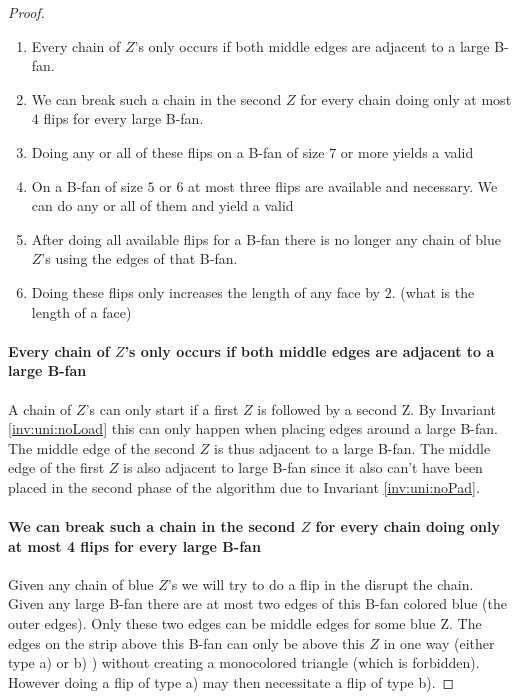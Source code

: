 \begin{proof}
  \begin{enumerate}
    \item Every chain of $Z$'s only occurs if both middle edges are adjacent to a large B-fan.
    \item We can break such a chain in the second $Z$ for every chain doing only at most 4 flips for every large B-fan.
    \item Doing any or all of these flips on a B-fan of size $7$ or more yields a valid \rel
    \item On a B-fan of size $5$ or $6$ at most three flips are available and necessary. We can do any or all of them and yield a valid \rel
    \item After doing all available flips for a B-fan there is no longer any chain of blue $Z$'s using the edges of that B-fan.
    \item Doing these flips only increases the length of any face by $2$. (what is the length of a face)
  \end{enumerate}

  \paragraph{Every chain of $Z$'s only occurs if both middle edges are adjacent to a large B-fan}
  A chain of $Z$'s can only start if a first $Z$ is followed by a second Z. By Invariant \ref{inv:uni:noLoad} this can only happen when placing edges around a large B-fan. The middle edge of the second $Z$ is thus adjacent to a large B-fan. The middle edge of the first $Z$ is also adjacent to large B-fan since it also can't have been placed in the second phase of the algorithm due to Invariant \ref{inv:uni:noPad}.

  \paragraph{We can break such a chain in the second $Z$ for every chain doing only at most 4 flips for every large B-fan}
  Given any chain of blue $Z$'s we will try to do a flip in the disrupt the chain. Given any large B-fan there are at most two edges of this B-fan colored blue (the outer edges). Only these two edges can be middle edges for some blue Z. The edges on the strip above this B-fan can only be above this $Z$ in one way (either type a) or b) ) without creating a monocolored triangle (which is forbidden). However doing a flip of type a) may then necessitate a flip of type b).


\end{proof}
